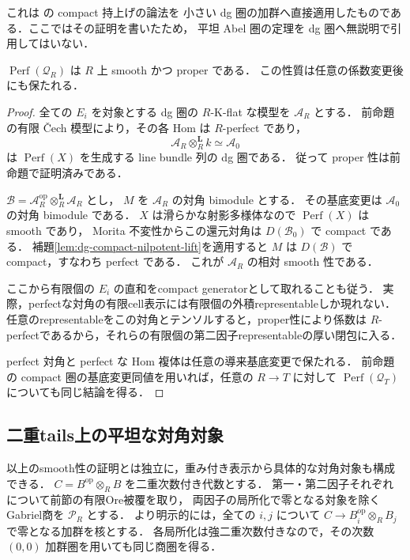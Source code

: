 \begin{remark}
これは \cite[Proposition~5.8]{DDL2011} の compact 持上げの論法を
小さい dg 圏の加群へ直接適用したものである．ここではその証明を書いたため，
平坦 Abel 圏の定理を dg 圏へ無説明で引用してはいない．
\end{remark}

\begin{theorem}
\label{thm:artin-smooth-proper}
$\operatorname{Perf}(\mathcal Q_R)$ は $R$ 上 smooth かつ proper である．
この性質は任意の係数変更後にも保たれる．
\end{theorem}
\begin{proof}
全ての $E_i$ を対象とする dg 圏の $R$-K-flat な模型を $\mathcal A_R$ とする．
前命題の有限 \v{C}ech 模型により，その各 Hom は $R$-perfect であり，
\[
 \mathcal A_R\otimes_R^{\mathbf L}k\simeq\mathcal A_0
\]
は $\operatorname{Perf}(X)$ を生成する line bundle 列の dg 圏である．
従って proper 性は前命題で証明済みである．

$\mathcal B=\mathcal A_R^{\mathrm{op}}
 \otimes_R^{\mathbf L}\mathcal A_R$ とし，
$M$ を $\mathcal A_R$ の対角 bimodule とする．
その基底変更は $\mathcal A_0$ の対角 bimodule である．
$X$ は滑らかな射影多様体なので $\operatorname{Perf}(X)$ は smooth であり，
Morita 不変性からこの還元対角は $D(\mathcal B_0)$ で compact である．
補題\ref{lem:dg-compact-nilpotent-lift}を適用すると $M$ は
$D(\mathcal B)$ で compact，すなわち perfect である．
これが $\mathcal A_R$ の相対 smooth 性である．

ここから有限個の $E_i$ の直和をcompact generatorとして取れることも従う．
実際，perfectな対角の有限cell表示には有限個の外積representableしか現れない．
任意のrepresentableをこの対角とテンソルすると，proper性により係数は
$R$-perfectであるから，それらの有限個の第二因子representableの厚い閉包に入る．


perfect 対角と perfect な Hom 複体は任意の導来基底変更で保たれる．
前命題の compact 圏の基底変更同値を用いれば，任意の $R\to T$ に対して
$\operatorname{Perf}(\mathcal Q_T)$ についても同じ結論を得る．
\end{proof}

\subsection{二重tails上の平坦な対角対象}
以上のsmooth性の証明とは独立に，重み付き表示から具体的な対角対象も構成できる．
$C=B^{\mathrm{op}}\otimes_RB$ を二重次数付き代数とする．
第一・第二因子それぞれについて前節の有限Ore被覆を取り，
両因子の局所化で零となる対象を除くGabriel商を $\mathcal P_R$ とする．
より明示的には，全ての $i,j$ について
$C\to B_i^{\mathrm{op}}\otimes_RB_j$ で零となる加群を核とする．
各局所化は強二重次数付きなので，その次数 $(0,0)$ 加群圏を用いても同じ商圏を得る．

